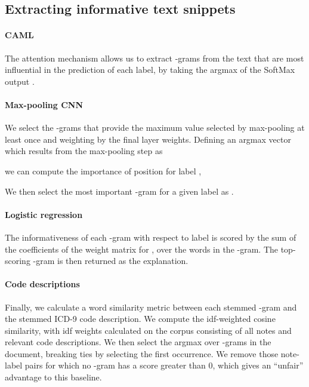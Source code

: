 \documentclass[11pt,a4paper]{article}
\begin{document}
\subsection{Extracting informative text snippets}

\paragraph{CAML}
The attention mechanism allows us to extract -grams from the text that are most influential in the prediction of each label, by taking the argmax of the SoftMax output .

\paragraph{Max-pooling CNN}
We select the -grams that provide the maximum value selected by max-pooling at least once and weighting by the final layer weights. Defining an argmax vector  which results from the max-pooling step as

we can compute the importance of position  for label ,

We then select the most important -gram for a given label as .

\paragraph{Logistic regression}
The informativeness of each -gram with respect to label  is scored by the sum of the coefficients of the weight matrix for , over the words in the -gram. The top-scoring -gram is then returned as the explanation.

\paragraph{Code descriptions} Finally, we calculate a word similarity metric between each stemmed -gram and the stemmed ICD-9 code description. We compute the idf-weighted cosine similarity, with idf weights calculated on the corpus consisting of all notes and relevant code descriptions. We then select the argmax over -grams in the document, breaking ties by selecting the first occurrence. We remove those note-label pairs for which no -gram has a score greater than 0, which gives an ``unfair'' advantage to this baseline.
\end{document}
